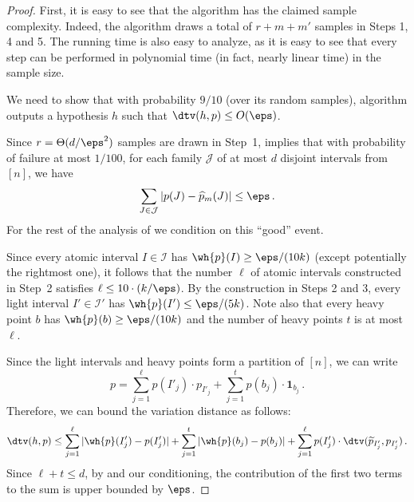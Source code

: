 \begin{proof} 
{First, it is easy to see that the algorithm has the claimed sample complexity.
Indeed, the algorithm draws a total of $r+m+m'$ samples in Steps 1, 4 and 5. 
The running time is also easy to analyze, as it is easy to see that
every step can be performed in polynomial time (in fact, nearly linear time)
in the sample size.}

We need to show that with probability $9/10$
(over its random samples), algorithm
\hyperref[alg:learn-kmodal-simple]{} outputs a hypothesis $h$ such that $\dtv(h,p) \leq O(\eps)$.


{Since $r = \Theta(d/\eps^2)$ samples are drawn in Step~1, 
implies that with probability of failure at most $1/100$,
for each family $\mathcal{J}$ of at most $d$ disjoint intervals from $[n]$, we have
\begin{equation} \label{eqn:cond}
\sum_{J \in \mathcal{J}} |p(J) - \widehat{p}_m(J)|  \le \eps\,.
\end{equation}
}
For the rest of the analysis of \hyperref[alg:learn-kmodal-simple]{}
we condition on this ``good'' event.

Since every atomic interval $I \in \mathcal{I}$ has $\wh{p}(I) \geq
\eps/(10k)$ (except potentially the rightmost one), it follows that the
number $\ell$ of atomic intervals constructed in Step~2 satisfies $\ell \leq
10 \cdot (k/\eps)$.  {By the construction in Steps 2 and 3,
every light interval $I'  \in \mathcal{I}'$ has $\wh{p}(I')  \leq \eps/(5k)$.}
Note also that every heavy point $b$ has $\wh{p}(b) \geq \eps/(10k)$ and
the number of heavy points $t$ is at most $\ell$.

%

Since the light intervals and heavy points form a partition of $[n]$, we
can write $$p =  \sum_{j=1}^{\ell} p(I'_j) \cdot p_{I'_j} + \sum_{j=1}^t p(b_j) \cdot {\bm 1}_{b_j}\,.$$
Therefore, we can bound the variation distance as follows:
\begin{equation} \label{eqn:dtv-ub}
\dtv(h,p) \leq  \sum_{j=1}^{\ell} |  \wh{p}(I'_j)  - p(I'_j) | +  \sum_{j=1}^t |  \wh{p}(b_j) - p(b_j)| 
 + \sum_{j=1}^{\ell} p(I'_j) \cdot \dtv (\widetilde{p}_{I'_j}, p_{I'_j})\,.
\end{equation}
{Since $\ell+t \le d$, by  and our conditioning, the contribution of the first two terms 
to the sum is upper bounded by $\eps$.}


\end{proof}

